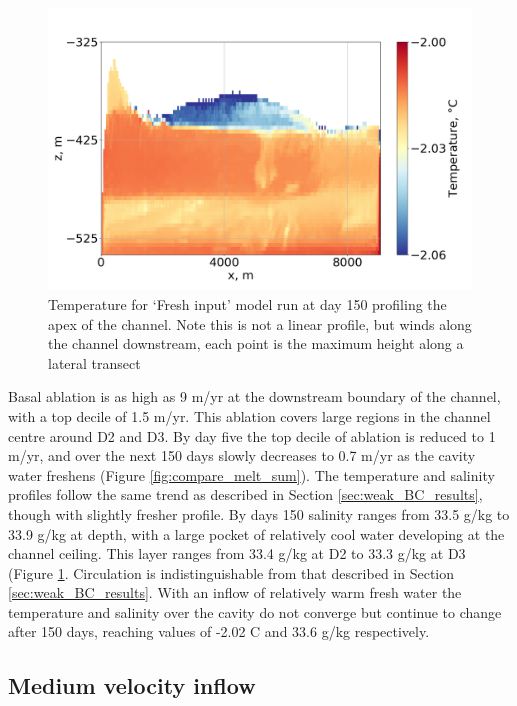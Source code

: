 \begin{figure}[!ht]
\centering
\includegraphics[width=1\textwidth]{chapters/4/fresh_input_T.png}
\caption[Fresh input (T)]{Temperature for `Fresh input' model run at day 150 profiling the apex of the channel. Note this is not a linear profile, but winds along the channel downstream, each point is the maximum height along a lateral transect}
\label{fig:fresh_input_T}
\end{figure}

Basal ablation is as high as 9 m/yr at the downstream boundary of the channel, with a top decile of 1.5 m/yr. This ablation covers large regions in the channel centre around D2 and D3. By day five the top decile of ablation is reduced to 1 m/yr, and over the next 150 days  slowly decreases to 0.7 m/yr as the cavity water freshens (Figure \ref{fig:compare_melt_sum}).
The temperature and salinity profiles follow the same trend as described in Section \ref{sec:weak_BC_results}, though with slightly fresher profile. By days 150 salinity ranges from 33.5 g/kg to 33.9 g/kg at depth, with a large pocket of relatively cool water developing at the channel ceiling. This layer ranges from 33.4 g/kg at D2  to 33.3 g/kg at D3 (Figure \ref{fig:fresh_input_T}. 
Circulation is indistinguishable from that described in Section \ref{sec:weak_BC_results}. 
With an inflow of relatively warm fresh  water the temperature and salinity over the cavity do not converge but continue to change after 150 days, reaching values of -2.02 \textdegree C and 33.6 g/kg respectively.



\subsection{Medium velocity inflow} \label{sec:medium_inflow}

